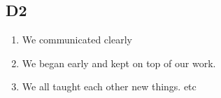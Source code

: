 \subsection{D2}
    \begin{enumerate}
        \item We communicated clearly
        \item We began early and kept on top of our work.
        \item We all taught each other new things. etc
    \end{enumerate}